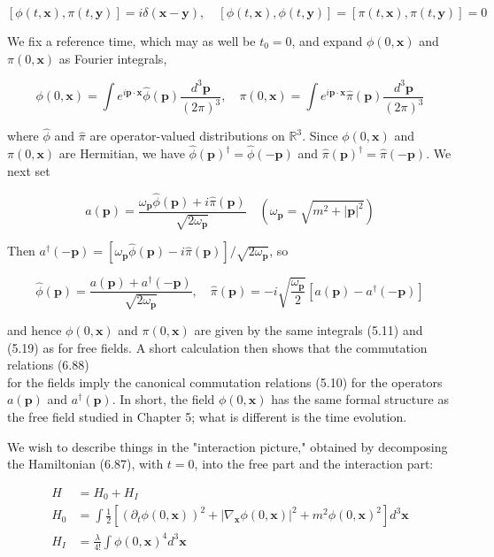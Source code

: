 \documentclass[10pt, letterpaper]{article}
\begin{document}
$$
[\phi(t, \mathbf{x}), \pi(t, \mathbf{y})]=i \delta(\mathbf{x}-\mathbf{y}), \quad[\phi(t, \mathbf{x}), \phi(t, \mathbf{y})]=[\pi(t, \mathbf{x}), \pi(t, \mathbf{y})]=0
$$

We fix a reference time, which may as well be $t_{0}=0$, and expand $\phi(0, \mathbf{x})$ and $\pi(0, \mathbf{x})$ as Fourier integrals,

$$
\phi(0, \mathbf{x})=\int e^{i \mathbf{p} \cdot \mathbf{x}} \widehat{\phi}(\mathbf{p}) \frac{d^{3} \mathbf{p}}{(2 \pi)^{3}}, \quad \pi(0, \mathbf{x})=\int e^{i \mathbf{p} \cdot \mathbf{x}} \widehat{\pi}(\mathbf{p}) \frac{d^{3} \mathbf{p}}{(2 \pi)^{3}}
$$

where $\widehat{\phi}$ and $\widehat{\pi}$ are operator-valued distributions on $\mathbb{R}^{3}$. Since $\phi(0, \mathbf{x})$ and $\pi(0, \mathbf{x})$ are Hermitian, we have $\widehat{\phi}(\mathbf{p})^{\dagger}=\widehat{\phi}(-\mathbf{p})$ and $\widehat{\pi}(\mathbf{p})^{\dagger}=\widehat{\pi}(-\mathbf{p})$. We next set

$$
a(\mathbf{p})=\frac{\omega_{\mathbf{p}} \widehat{\phi}(\mathbf{p})+i \widehat{\pi}(\mathbf{p})}{\sqrt{2 \omega_{\mathbf{p}}}} \quad\left(\omega_{\mathbf{p}}=\sqrt{m^{2}+|\mathbf{p}|^{2}}\right)
$$

Then $a^{\dagger}(-\mathbf{p})=\left[\omega_{\mathbf{p}} \widehat{\phi}(\mathbf{p})-i \widehat{\pi}(\mathbf{p})\right] / \sqrt{2 \omega_{\mathbf{p}}}$, so

$$
\widehat{\phi}(\mathbf{p})=\frac{a(\mathbf{p})+a^{\dagger}(-\mathbf{p})}{\sqrt{2 \omega_{\mathbf{p}}}}, \quad \widehat{\pi}(\mathbf{p})=-i \sqrt{\frac{\omega_{\mathbf{p}}}{2}}\left[a(\mathbf{p})-a^{\dagger}(-\mathbf{p})\right]
$$

and hence $\phi(0, \mathbf{x})$ and $\pi(0, \mathbf{x})$ are given by the same integrals (5.11) and (5.19) as for free fields. A short calculation then shows that the commutation relations (6.88)\\
for the fields imply the canonical commutation relations (5.10) for the operators $a(\mathbf{p})$ and $a^{\dagger}(\mathbf{p})$. In short, the field $\phi(0, \mathbf{x})$ has the same formal structure as the free field studied in Chapter 5; what is different is the time evolution.

We wish to describe things in the "interaction picture," obtained by decomposing the Hamiltonian (6.87), with $t=0$, into the free part and the interaction part:

$$
\begin{aligned}
H & =H_{0}+H_{I} \\
H_{0} & =\int \frac{1}{2}\left[\left(\partial_{t} \phi(0, \mathbf{x})\right)^{2}+\left|\nabla_{\mathbf{x}} \phi(0, \mathbf{x})\right|^{2}+m^{2} \phi(0, \mathbf{x})^{2}\right] d^{3} \mathbf{x} \\
H_{I} & =\frac{\lambda}{4!} \int \phi(0, \mathbf{x})^{4} d^{3} \mathbf{x}
\end{aligned}
$$
\end{document}
